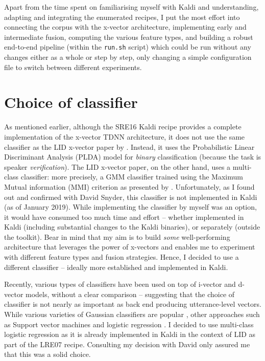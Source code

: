 \documentclass[bsc,frontabs,twoside,singlespacing,parskip,deptreport]{infthesis}
\begin{document}
{{    %
    Apart from the time spent on familiarising myself with Kaldi and understanding, adapting and integrating the enumerated recipes, I put the most effort into connecting the corpus with the x-vector architecture, implementing early and intermediate fusion, computing the various feature types, and building a robust end-to-end pipeline (within the \texttt{run.sh} script) which could be run without any changes either as a whole or step by step, only changing a simple configuration file to switch between different experiments.
  }

  \section{Choice of classifier}{
    \label{sec:classifier}
    As mentioned earlier, although the SRE16 Kaldi recipe provides a complete implementation of the x-vector TDNN architecture, it does not use the same classifier as the LID x-vector paper by \citeauthor{Snyder_et_al_2018}. Instead, it uses the Probabilistic Linear Discriminant Analysis (PLDA) model for \textit{binary} classification (because the task is speaker \textit{verification}). The LID x-vector paper, on the other hand, uses a multi-class classifier: more precisely, a GMM classifier trained using the Maximum Mutual information (MMI) criterion as presented by \citet{McCree_2014}. Unfortunately, as I found out and confirmed with David Snyder, this classifier is not implemented in Kaldi (as of January 2019). While implementing the classifier by myself was an option, it would have consumed too much time and effort -- whether implemented in Kaldi (including substantial changes to the Kaldi binaries), or separately (outside the toolkit). Bear in mind that my aim is to build \textit{some} well-performing architecture that leverages the power of x-vectors and enables me to experiment with different feature types and fusion strategies. Hence, I decided to use a different classifier -- ideally more established and implemented in Kaldi.
    
    Recently, various types of classifiers have been used on top of i-vector and d-vector models, without a clear comparison -- suggesting that the choice of classifier is not nearly as important as back end producing utterance-level vectors. While various varieties of Gaussian classifiers are popular \citep{Martinez_et_al_2013,McCree_2014,Plchot_et_al_2016}, other approaches such as Support vector machines \citep{dvectors_lid,Martinez_et_al_2011} and logistic regression \citep{Sarma_et_al_2018,Martinez_et_al_2011,Martinez_et_al_2012}. I decided to use multi-class logistic regression as it is already implemented in Kaldi in the context of LID as part of the LRE07 recipe. Consulting my decision with David \citet{Snyder_2018_kaldi-help} only assured me that this was a solid choice.

}}
\end{document}
